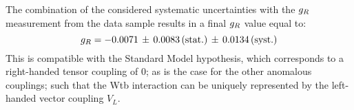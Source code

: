 

The combination of the considered systematic uncertainties with the $g_{R}$ measurement from the data sample results in a final $g_{R}$ value equal to:
\begin{equation}
 g_{R} = -0.0071 \, \pm \, 0.0083 \, (\textrm{stat.}) \, \pm \, 0.0134  \, (\textrm{syst.})
\end{equation}
This is compatible with the Standard Model hypothesis, which corresponds to a right-handed tensor coupling of $0$; as is the case for the other anomalous couplings; such that the Wtb interaction can be uniquely represented by the left-handed vector coupling $V_L$.
